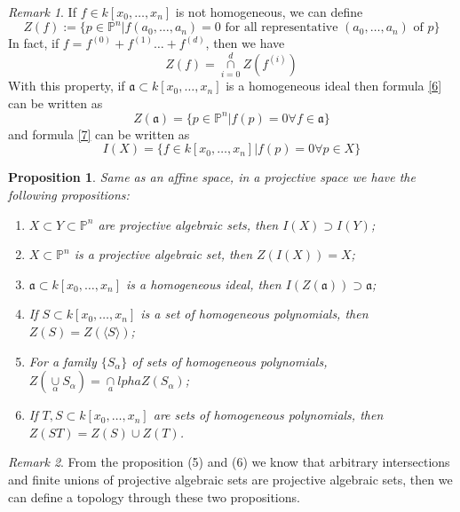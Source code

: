 \documentclass{amsart}
\theoremstyle{plain}
\newtheorem{proposition}{Proposition}
\theoremstyle{definition}
\theoremstyle{remark}
\newtheorem*{remark}{Remark}
\numberwithin{equation}{section}
\begin{document}
\begin{remark}
	If $ f\in k[x_0,\dots,x_n] $ is not homogeneous, we can define 
	\begin{equation}
	Z(f):=\{ p\in\mathbb{P}^n| f(a_0,\dots,a_n)=0\text{ for all representative } (a_0,\dots,a_n) \text{ of } p \}
	\end{equation}
	In fact, if $ f=f^{(0)}+f^{(1)}\dots +f^{(d)} $, then we have 
	\begin{equation}
	Z(f)=\mathop{\cap}\limits_{i=0}^{d}Z(f^{(i)})
	\end{equation}
	With this property, if $ \mathfrak{a} \subset k[x_0,\dots,x_n]$ is a homogeneous ideal then formula \ref{6} can be written as
	\begin{equation}
	Z(\mathfrak{a})=\{ p\in \mathbb{P}^n| f(p)=0 \forall f\in \mathfrak{a} \}
	\end{equation}
	and formula \ref{7} can be written as
	\begin{equation}
	I(X)=\{ f\in k[x_0,\dots,x_n]|f(p)=0 \forall p\in X \}
	\end{equation}
\end{remark}
\begin{proposition}
	Same as an affine space, in a projective space we have the following propositions:
\begin{enumerate}
		\item $ X\subset Y\subset \mathbb{P}^n $ are projective algebraic sets, then 
		$ I(X)\supset I(Y) $;
		\item $ X\subset \mathbb{P}^n $ is a projective algebraic set, then $ Z(I(X))=X $;
		\item $ \mathfrak{a}\subset k[x_0,\dots,x_n] $ is a homogeneous ideal, then $ I(Z(\mathfrak{a}))\supset \mathfrak{a} $;
		\item If $ S\subset k[x_0,\dots,x_n] $ is a set of homogeneous polynomials, then $ Z(S)=Z(\langle S \rangle ) $;
		\item For a family $ \{ S_\alpha \} $ of sets of homogeneous polynomials, $ Z(\mathop{\cup}\limits_\alpha S_\alpha) = \mathop{\cap}\limits_alpha Z(S_\alpha)$;
		\item If $ T,S\subset k[x_0,\dots,x_n] $ are sets of homogeneous polynomials, then $ Z(ST)=Z(S)\cup Z(T) $.
	\end{enumerate}
\end{proposition}
\begin{remark}
	From the proposition (5) and (6) we know that arbitrary intersections and finite unions  of projective algebraic sets are projective algebraic sets, then we can define a topology through these two propositions.
\end{remark}
\end{document}

